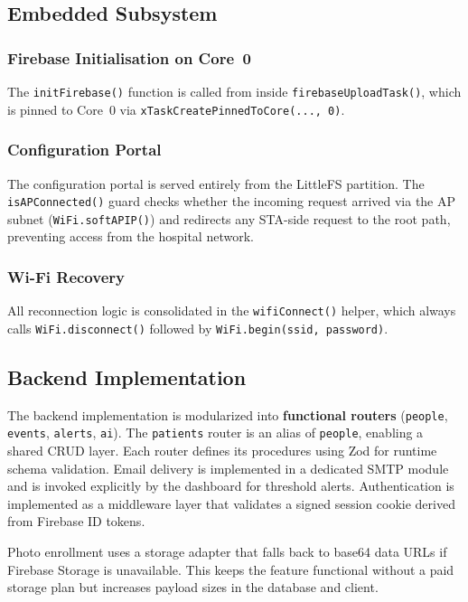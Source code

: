 \subsection{Embedded Subsystem}

\subsubsection{Firebase Initialisation on Core~0}

The \texttt{initFirebase()} function is called from inside
\texttt{firebaseUploadTask()}, which is pinned to Core~0 via
\texttt{xTaskCreatePinnedToCore(..., 0)}.

\subsubsection{Configuration Portal}

The configuration portal is served entirely from the LittleFS partition.
The \texttt{isAPConnected()} guard checks whether the incoming request arrived via
the AP subnet (\texttt{WiFi.softAPIP()}) and redirects any STA-side request to the
root path, preventing access from the hospital network.

\subsubsection{Wi-Fi Recovery}

All reconnection logic is consolidated in the \texttt{wifiConnect()} helper, which
always calls \texttt{WiFi.disconnect()} followed by
\texttt{WiFi.begin(ssid, password)}.

\subsection{Backend Implementation}
The backend implementation is modularized into \textbf{functional routers} (\texttt{people}, \texttt{events}, \texttt{alerts}, \texttt{ai}). The \texttt{patients} router is an alias of \texttt{people}, enabling a shared CRUD layer. Each router defines its procedures using Zod for runtime schema validation. Email delivery is implemented in a dedicated SMTP module and is invoked explicitly by the dashboard for threshold alerts. Authentication is implemented as a middleware layer that validates a signed session cookie derived from Firebase ID tokens.

Photo enrollment uses a storage adapter that falls back to base64 data URLs if
Firebase Storage is unavailable. This keeps the feature functional without a
paid storage plan but increases payload sizes in the database and client.

